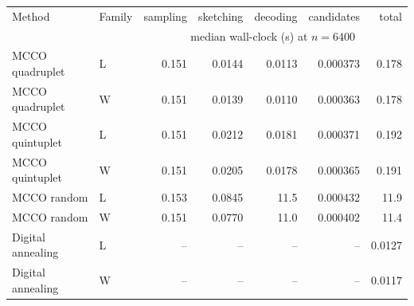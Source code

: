 \begin{tabular}{llrrrrr}
\hline
Method & Family & sampling & sketching & decoding & candidates & total \\
 & & \multicolumn{5}{c}{median wall-clock (s) at $n = 6400$} \\
\hline
MCCO quadruplet & L & 0.151 & 0.0144 & 0.0113 & 0.000373 & 0.178 \\
MCCO quadruplet & W & 0.151 & 0.0139 & 0.0110 & 0.000363 & 0.178 \\
MCCO quintuplet & L & 0.151 & 0.0212 & 0.0181 & 0.000371 & 0.192 \\
MCCO quintuplet & W & 0.151 & 0.0205 & 0.0178 & 0.000365 & 0.191 \\
MCCO random & L & 0.153 & 0.0845 & 11.5 & 0.000432 & 11.9 \\
MCCO random & W & 0.151 & 0.0770 & 11.0 & 0.000402 & 11.4 \\
Digital annealing & L & -- & -- & -- & -- & 0.0127 \\
Digital annealing & W & -- & -- & -- & -- & 0.0117 \\
\hline
\end{tabular}
